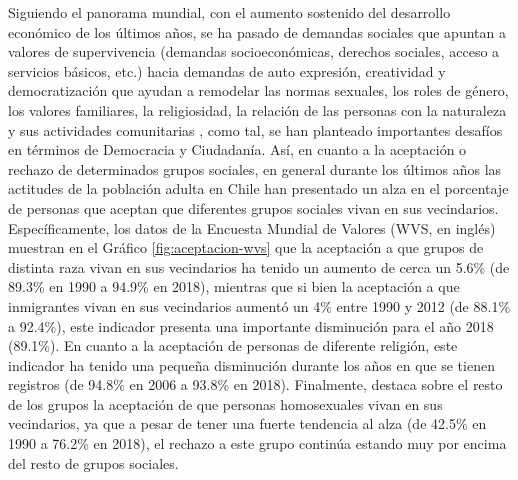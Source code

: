 \documentclass[12pt,twoside]{templates/facsothesis}
\begin{document}
Siguiendo el panorama mundial, con el aumento sostenido del desarrollo económico de los últimos años, se ha pasado de demandas sociales que apuntan a valores de supervivencia (demandas socioeconómicas, derechos sociales, acceso a servicios básicos, etc.) hacia demandas de auto expresión, creatividad y democratización que ayudan a remodelar las normas sexuales, los roles de género, los valores familiares, la religiosidad, la relación de las personas con la naturaleza y sus actividades comunitarias \citep{inglehart_Modernization_2001}, como tal, se han planteado importantes desafíos en términos de Democracia y Ciudadanía. Así, en cuanto a la aceptación o rechazo de determinados grupos sociales, en general durante los últimos años las actitudes de la población adulta en Chile han presentado un alza en el porcentaje de personas que aceptan que diferentes grupos sociales vivan en sus vecindarios. Específicamente, los datos de la Encuesta Mundial de Valores (WVS, en inglés) muestran en el Gráfico \ref{fig:aceptacion-wvs} que la aceptación a que grupos de distinta raza vivan en sus vecindarios ha tenido un aumento de cerca un 5.6\% (de 89.3\% en 1990 a 94.9\% en 2018), mientras que si bien la aceptación a que inmigrantes vivan en sus vecindarios aumentó un 4\% entre 1990 y 2012 (de 88.1\% a 92.4\%), este indicador presenta una importante disminución para el año 2018 (89.1\%). En cuanto a la aceptación de personas de diferente religión, este indicador ha tenido una pequeña disminución durante los años en que se tienen registros (de 94.8\% en 2006 a 93.8\% en 2018). Finalmente, destaca sobre el resto de los grupos la aceptación de que personas homosexuales vivan en sus vecindarios, ya que a pesar de tener una fuerte tendencia al alza (de 42.5\% en 1990 a 76.2\% en 2018), el rechazo a este grupo continúa estando muy por encima del resto de grupos sociales.
\end{document}
